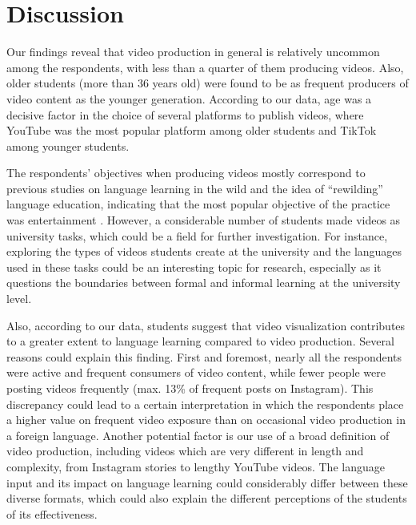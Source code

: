 \section{Discussion}\label{sec-discussion}

Our findings reveal that video production in general is relatively uncommon among the respondents, with less than a quarter of them producing videos. Also, older students (more than 36 years old) were found to be as frequent producers of video content as the younger generation. According to our data, age was a decisive factor in the choice of several platforms to publish videos, where YouTube was the most popular platform among older students and TikTok among younger students.

The respondents’ objectives when producing videos mostly correspond to previous studies on language learning in the wild and the idea of “rewilding” language education, indicating that the most popular objective of the practice was entertainment \cite{thorne2021}. However, a considerable number of students made videos as university tasks, which could be a field for further investigation. For instance, exploring the types of videos students create at the university and the languages used in these tasks could be an interesting topic for research, especially as it questions the boundaries between formal and informal learning at the university level.

Also, according to our data, students suggest that video visualization contributes to a greater extent to language learning compared to video production. Several reasons could explain this finding. First and foremost, nearly all the respondents were active and frequent consumers of video content, while fewer people were posting videos frequently (max. 13\% of frequent posts on Instagram). This discrepancy could lead to a certain interpretation in which the respondents place a higher value on frequent video exposure than on occasional video production in a foreign language. Another potential factor is our use of a broad definition of video production, including videos which are very different in length and complexity, from Instagram stories to lengthy YouTube videos. The language input and its impact on language learning could considerably differ between these diverse formats, which could also explain the different perceptions of the students of its effectiveness.

